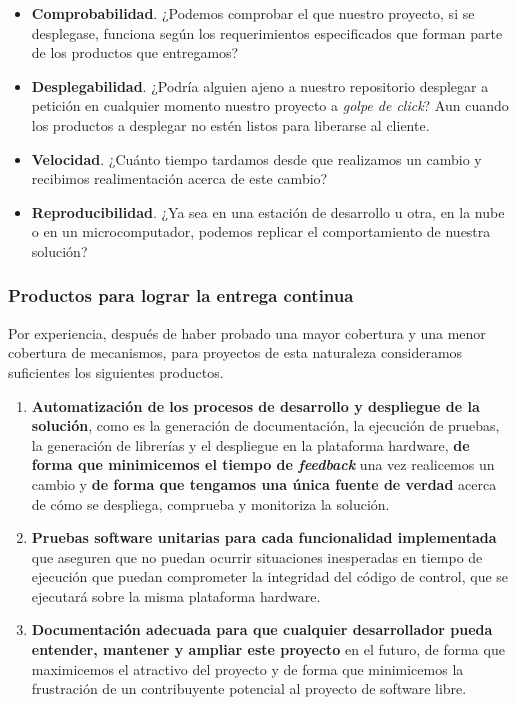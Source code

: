 \begin{itemize}
    \item \textbf{Comprobabilidad}. ¿Podemos comprobar el que nuestro proyecto, si se desplegase,
          funciona según
          los requerimientos especificados que forman parte de los productos que
          entregamos?
    \item \textbf{Desplegabilidad}. ¿Podría alguien ajeno a nuestro repositorio desplegar a
          petición en cualquier momento nuestro proyecto a \textit{golpe de click}?
          Aun cuando los productos a desplegar no estén listos para liberarse al cliente.
    \item \textbf{Velocidad}. ¿Cuánto tiempo tardamos desde que realizamos un cambio y recibimos
          realimentación acerca de este cambio?
    \item \textbf{Reproducibilidad}. ¿Ya sea en una estación de desarrollo u otra, en la nube
          o en un microcomputador, podemos replicar el comportamiento de nuestra solución?
\end{itemize}

\subsubsection{Productos para lograr la entrega continua}

Por experiencia, después de haber probado una mayor cobertura y una
menor cobertura de mecanismos, para proyectos de esta naturaleza
consideramos suficientes los siguientes productos.

\begin{enumerate}
    \item \textbf{Automatización de los procesos de desarrollo y despliegue de la solución}, como es
    la generación de documentación, la ejecución de pruebas, la generación de librerías
    y el despliegue en la plataforma hardware, \textbf{de forma que minimicemos el tiempo de \textit{feedback}}
    una vez realicemos un cambio y \textbf{de forma que tengamos una única fuente de verdad} acerca de cómo
    se despliega, comprueba y monitoriza la solución.
    \item \textbf{Pruebas software unitarias para cada funcionalidad implementada} que aseguren que no
    puedan ocurrir situaciones inesperadas en tiempo
    de ejecución que puedan comprometer la integridad del código de control, que se ejecutará sobre
    la misma plataforma hardware.
    \item \textbf{Documentación adecuada para que cualquier desarrollador pueda entender,
    mantener y ampliar este proyecto} en el futuro, de forma que maximicemos el atractivo
    del proyecto y de forma que minimicemos la frustración de un contribuyente potencial
    al proyecto de software libre.
\end{enumerate}

